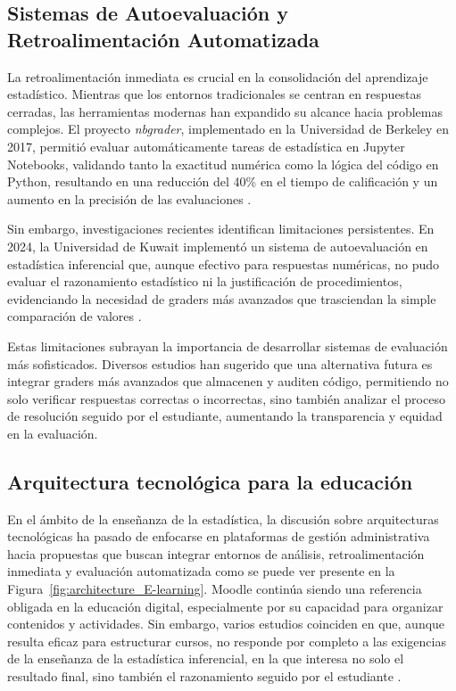 \documentclass[letter,oneside,12pt,spanish]{report}
\begin{document}
\subsection{Sistemas de Autoevaluación y Retroalimentación Automatizada}
La retroalimentación inmediata es crucial en la consolidación del aprendizaje estadístico. Mientras que los entornos tradicionales se centran en respuestas cerradas, las herramientas modernas han expandido su alcance hacia problemas complejos. El proyecto \textit{nbgrader}, implementado en la Universidad de Berkeley en 2017, permitió evaluar automáticamente tareas de estadística en Jupyter Notebooks, validando tanto la exactitud numérica como la lógica del código en Python, resultando en una reducción del 40\% en el tiempo de calificación y un aumento en la precisión de las evaluaciones \parencite{Blank2017}.

Sin embargo, investigaciones recientes identifican limitaciones persistentes. En 2024, la Universidad de Kuwait implementó un sistema de autoevaluación en estadística inferencial que, aunque efectivo para respuestas numéricas, no pudo evaluar el razonamiento estadístico ni la justificación de procedimientos, evidenciando la necesidad de graders más avanzados que trasciendan la simple comparación de valores \parencite{AlHaddad2024}.

Estas limitaciones subrayan la importancia de desarrollar sistemas de evaluación más sofisticados. Diversos estudios han sugerido que una alternativa futura es integrar graders más avanzados que almacenen y auditen código, permitiendo no solo verificar respuestas correctas o incorrectas, sino también analizar el proceso de resolución seguido por el estudiante, aumentando la transparencia y equidad en la evaluación.


\subsection{Arquitectura tecnológica para la educación}

En el ámbito de la enseñanza de la estadística, la discusión sobre arquitecturas tecnológicas ha pasado de enfocarse en plataformas de gestión administrativa hacia propuestas que buscan integrar entornos de análisis, retroalimentación inmediata y evaluación automatizada como se puede ver presente en la Figura~\ref{fig:architecture_E-learning}. Moodle continúa siendo una referencia obligada en la educación digital, especialmente por su capacidad para organizar contenidos y actividades. Sin embargo, varios estudios coinciden en que, aunque resulta eficaz para estructurar cursos, no responde por completo a las exigencias de la enseñanza de la estadística inferencial, en la que interesa no solo el resultado final, sino también el razonamiento seguido por el estudiante \parencite{Pacheco2025, Ndibalema2025}.
\end{document}
